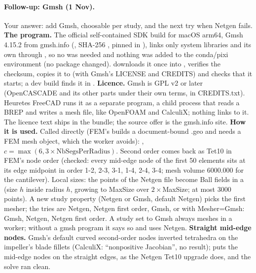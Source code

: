 \paragraph{Follow-up: Gmsh (1 Nov).} Your answer: add Gmsh, choosable per study, and the next try when Netgen fails.
\textbf{The program.} The official self-contained SDK build for macOS arm64, Gmsh 4.15.2 from gmsh.info
(, SHA-256 , pinned in ), links only system
libraries and its own  through , so no  was needed and
nothing was added to the conda/pixi environment (no package changed).  downloads it once into
, verifies the checksum, copies it to  (with Gmsh's
LICENSE and CREDITS) and checks that it starts; a dev build finds it in . \textbf{Licence.} Gmsh is GPL v2 or
later (OpenCASCADE and its other parts under their own terms, in CREDITS.txt). Heuretes FreeCAD runs it as a separate program, a
child process that reads a BREP and writes a mesh file, like OpenFOAM and CalculiX; nothing links to it. The licence text
ships in the bundle; the source offer is the gmsh.info site.
\textbf{How it is used.} Called directly (FEM's  builds a document-bound .geo and needs a FEM mesh object, which the
worker avoids): ,
$c=\max(6,3\times\text{NbSegsPerRadius})$. Second order comes back as Tet10 in FEM's node order (checked: every mid-edge node of
the first 50 elements sits at its edge midpoint in order 1-2, 2-3, 3-1, 1-4, 2-4, 3-4; mesh volume 6000.000 for the cantilever).
Local sizes: the points of the Netgen  file become Ball fields in a  (size $h$ inside radius $h$, growing to
MaxSize over $2\times$MaxSize; at most 3000 points). A new study property  (Netgen or Gmsh, default Netgen)
picks the first mesher; the tries are Netgen, Netgen first order, Gmsh, or with Mesher=Gmsh: Gmsh, Netgen, Netgen first order.
A study set to Gmsh always meshes in a worker; without a gmsh program it says so and uses Netgen.
\textbf{Straight mid-edge nodes.} Gmsh's default curved second-order nodes inverted tetrahedra on the impeller's blade
fillets (CalculiX: ``nonpositive Jacobian'', no result);  puts the mid-edge nodes on the straight
edges, as the Netgen Tet10 upgrade does, and the solve ran clean.
